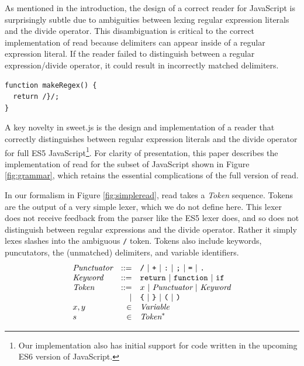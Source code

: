 \documentclass[preprint,10pt]{sigplanconf}
\begin{document}
As mentioned in the introduction, the design of a correct reader for JavaScript is surprisingly subtle due to ambiguities between lexing regular expression literals and the divide operator. This disambiguation is critical to the correct implementation of read because delimiters can appear inside of a regular expression literal. If the reader failed to distinguish between a regular expression/divide operator, it could result in incorrectly matched delimiters. 
\begin{lstlisting}
function makeRegex() {
  return /}/;  
}
\end{lstlisting}

A key novelty in sweet.js is the design and implementation of a reader
that correctly distinguishes between regular expression literals and
the divide operator for full ES5 JavaScript\footnote{Our
  implementation also has initial support for code written in the
  upcoming ES6 version of JavaScript.}. For clarity of presentation,
this paper describes the implementation of read for the subset of
JavaScript shown in Figure \ref{fig:grammar}, which retains the
essential complications of the full version of read.

In our formalism in Figure \ref{fig:simpleread}, read takes a \textit{Token} sequence. Tokens are the output of a very simple lexer, which we do not define here. This lexer does not receive feedback from the parser like the ES5 lexer does, and so does not distinguish between regular expressions and the divide operator. Rather it simply lexes slashes into the ambiguous \texttt{/} token. Tokens also include keywords, puncutators, the (unmatched) delimiters, and variable identifiers.
\[
\begin{array}{lrl}
  \textit{Punctuator} &::=& \texttt{/} ~|~ \texttt{+} ~|~ \texttt{:} ~|~
  \texttt{;} ~|~ \texttt{=} ~|~ \texttt{.}
  \\
  \textit{Keyword} &::=& \texttt{return} ~|~ \texttt{function}~|~ \texttt{if}
  \\
  \textit{Token} &::=& x ~|~ \textit{Punctuator} ~|~ \textit{Keyword}
  \\
  &|& 
  \texttt{\{} ~|~ 
  \texttt {\}} ~|~  
  \texttt{(} ~|~ 
  \texttt{)}
  \\
  x, y &\in& \textit{Variable}
  \\
  s &\in& \textit{Token}^{*}
 \end{array}
\]
\end{document}

